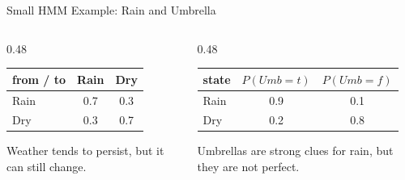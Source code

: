 \documentclass[aspectratio=169]{beamer}
\begin{document}
\begin{frame}{Small HMM Example: Rain and Umbrella}
\small
\begin{columns}[T,onlytextwidth]
  \begin{column}{0.48\textwidth}
    \begin{center}
    \begin{tabular}{lcc}
    \toprule
    from / to & Rain & Dry \\
    \midrule
    Rain & 0.7 & 0.3 \\
    Dry  & 0.3 & 0.7 \\
    \bottomrule
    \end{tabular}
    \end{center}
    \begin{tcolorbox}[colback=plainbg,colframe=plainframe,boxrule=0.7pt,title=Transition idea]
    Weather tends to persist, but it can still change.
    \end{tcolorbox}
  \end{column}
  \begin{column}{0.48\textwidth}
    \begin{center}
    \begin{tabular}{lcc}
    \toprule
    state & $P(Umb{=}t)$ & $P(Umb{=}f)$ \\
    \midrule
    Rain & 0.9 & 0.1 \\
    Dry  & 0.2 & 0.8 \\
    \bottomrule
    \end{tabular}
    \end{center}
    \begin{tcolorbox}[colback=questionbg,colframe=questionframe,boxrule=0.7pt,title=Sensor idea]
    Umbrellas are strong clues for rain, but they are not perfect.
    \end{tcolorbox}
  \end{column}
\end{columns}
\end{frame}
\end{document}
